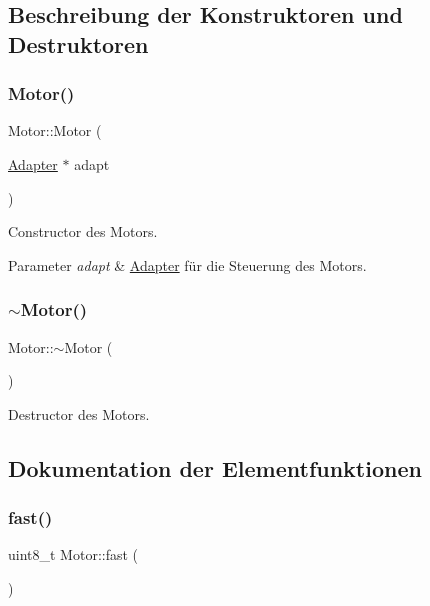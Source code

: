 \subsection{Beschreibung der Konstruktoren und Destruktoren}
\hypertarget{class_motor_a9150fc4647f7588364cb75dca1df4c96}{}\label{class_motor_a9150fc4647f7588364cb75dca1df4c96} 
\subsubsection{\texorpdfstring{Motor()}{Motor()}}
{\footnotesize\ttfamily Motor\+::\+Motor (\begin{DoxyParamCaption}\item[{\hyperlink{class_adapter}{Adapter} $\ast$}]{adapt }\end{DoxyParamCaption})}

Constructor des Motors.


\begin{DoxyParams}{Parameter}
{\em adapt} & \hyperlink{class_adapter}{Adapter} für die Steuerung des Motors. \\
\hline
\end{DoxyParams}
\hypertarget{class_motor_a2e57c7b2681efea1d3b7f253ee88ecd4}{}\label{class_motor_a2e57c7b2681efea1d3b7f253ee88ecd4} 
\subsubsection{\texorpdfstring{$\sim$\+Motor()}{~Motor()}}
{\footnotesize\ttfamily Motor\+::$\sim$\+Motor (\begin{DoxyParamCaption}{ }\end{DoxyParamCaption})\hspace{0.3cm}{\ttfamily [virtual]}}

Destructor des Motors. 

\subsection{Dokumentation der Elementfunktionen}
\hypertarget{class_motor_a09b1a5376d1ea0eb39dff2ebcc325bde}{}\label{class_motor_a09b1a5376d1ea0eb39dff2ebcc325bde} 
\subsubsection{\texorpdfstring{fast()}{fast()}}
{\footnotesize\ttfamily uint8\+\_\+t Motor\+::fast (\begin{DoxyParamCaption}{ }\end{DoxyParamCaption})}

